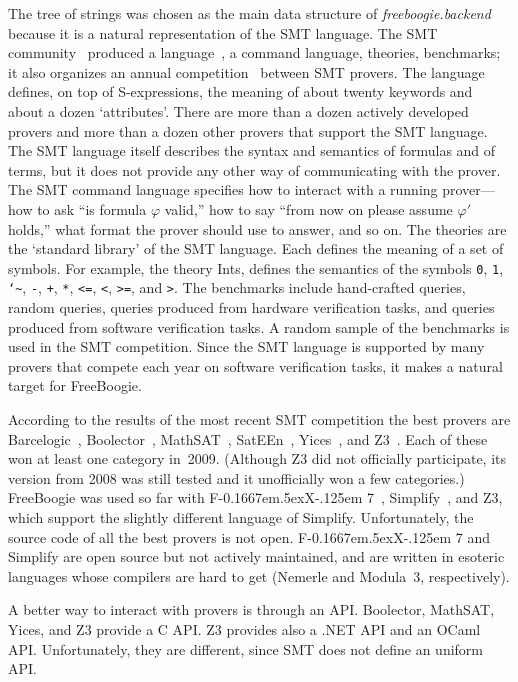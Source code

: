 \documentclass[a4paper]{article}
\newcommand{\fx}{F\kern-0.1667em\lower.5ex\hbox{X}\kern-.125em 7\xspace}
\theoremstyle{slanted}
\theoremstyle{definition}
\theoremstyle{remark}
\begin{document}
The tree of strings was chosen as the main data
structure of \textit{freeboogie.backend} because it
is a natural representation of the SMT language. The
SMT community~\cite{ranise2009smtlib} produced a
language~\cite{ranise2006smtlang}, a command language,
theories, benchmarks; it also organizes an annual
competition~\cite{barrett2005} between SMT provers. The language
defines, on top of S-expressions, the meaning of about twenty
keywords and about a dozen `attributes'. There are more than a
dozen actively developed provers and more than a dozen other
provers that support the SMT language. The SMT language itself
describes the syntax and semantics of formulas and of terms,
but it does not provide any other way of communicating with the
prover. The SMT command language specifies how to interact with
a running prover---how to ask ``is formula $\varphi$ valid,''
how to say ``from now on please assume $\varphi'$ holds,''
what format the prover should use to answer, and so on. The
theories are the `standard library' of the SMT language. Each
defines the meaning of a set of symbols. For example, the
theory Ints, defines the semantics of the symbols \texttt{0},
\texttt{1}, \texttt{\char`\~}, \texttt{-}, \texttt{+},
\texttt{*}, \texttt{<=}, \texttt{<}, \texttt{>=}, and \texttt{>}.
The benchmarks include hand-crafted queries, random queries,
queries produced from hardware verification tasks, and queries
produced from software verification tasks. A random sample of the
benchmarks is used in the SMT competition. Since the SMT language
is supported by many provers that compete each year on software
verification tasks, it makes a natural target for FreeBoogie.

According to the results of the most recent SMT competition
the best provers are Barcelogic~\cite{bofill2008barcelogic},
Boolector~\cite{brummayer2009boolector},
MathSAT~\cite{bruttomesso2008mathsat}, SatEEn~\cite{sateen},
Yices~\cite{yices}, and Z3~\cite{moura2008z3}. Each of these won
at least one category in~2009. (Although Z3 did not officially
participate, its version from 2008 was still tested and it
unofficially won a few categories.) FreeBoogie was used so
far with \fx~\cite{fx7}, Simplify~\cite{detlefs2005}, and Z3,
which support the slightly different language of Simplify.
Unfortunately, the source code of all the best provers is
not open. \fx and Simplify are open source but not actively
maintained, and are written in esoteric languages whose compilers
are hard to get (Nemerle and Modula~3, respectively).

A better way to interact with provers is through an API\null.
Boolector, MathSAT, Yices, and Z3 provide a C API\null. Z3
provides also a .NET API and an OCaml API\null. Unfortunately,
they are different, since SMT does not define an uniform
API\null.
\end{document}
